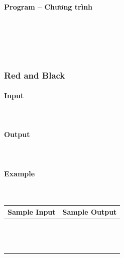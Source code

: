 \documentclass{article}
\begin{document}
\paragraph{Program -- Chương trình} \mbox{} \\


\begin{lstlisting}
	
	
\end{lstlisting}
\subsubsection{Red and Black}
 

\paragraph{Input} \mbox{} \\



\paragraph{Output}\mbox{} \\


\paragraph{Example}\mbox{} \\

\begin{table}[h]
    \centering
    \begin{tabular}{|l|r|}
        \hline
        \textbf{Sample Input} & \textbf{Sample Output} \\
        \hline
		&  \\ 
		&  \\ 
		&  \\ 
		&  \\ 
		&  \\
		&  \\ 
		&  \\ 
		&  \\ 
		&  \\ 
		&  \\ 
		&  \\ 
		&  \\
		&  \\ \hline
    \end{tabular}
\end{table}
\end{document}
